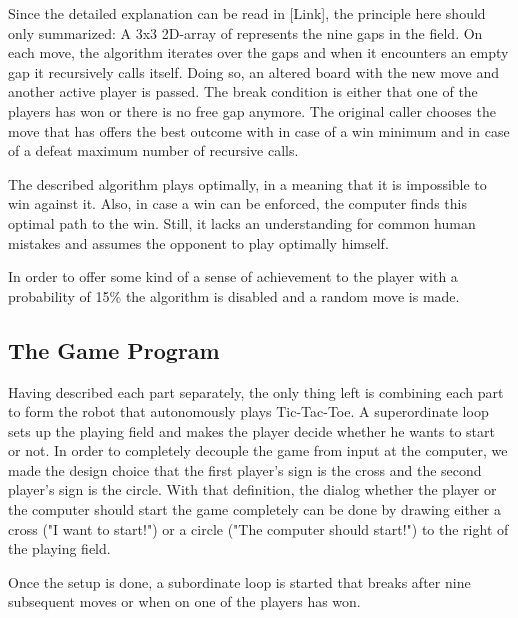 \documentclass{sig-alternate-05-2015}
\begin{document}
Since the detailed explanation can be read in [Link], the principle here should only summarized: A 3x3 2D-array of represents the nine gaps in the field. On each move, the algorithm iterates over the gaps and when it encounters an empty gap it recursively calls itself. Doing so, an altered board with the new move and another active player is passed. The break condition is either that one of the players has won or there is no free gap anymore. The original caller chooses the move that has offers the best outcome with in case of a win minimum and in case of a defeat maximum number of recursive calls.

The described algorithm plays optimally, in a meaning that it is impossible to win against it. Also, in case a win can be enforced, the computer finds this optimal path to the win. Still, it lacks an understanding for common human mistakes and assumes the opponent to play optimally himself.

In order to offer some kind of a sense of achievement to the player with a probability of 15\% the algorithm is disabled and a random move is made.
\subsection{The Game Program}
Having described each part separately, the only thing left is combining each part to form the robot that autonomously plays Tic-Tac-Toe. A superordinate loop sets up the playing field and makes the player decide whether he wants to start or not. In order to completely decouple the game from input at the computer, we made the design choice that the first player's sign is the cross and the second player's sign is the circle. With that definition, the dialog whether the player or the computer should start the game completely can be done by drawing either a cross ("I want to start!") or a circle ("The computer should start!") to the right of the playing field.

Once the setup is done, a subordinate loop is started that breaks after nine subsequent moves or when on one of the players has won.
\end{document}
